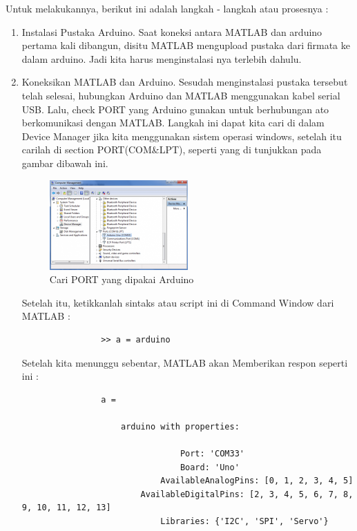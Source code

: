 	Untuk melakukannya, berikut ini adalah langkah - langkah atau prosesnya :
		\begin{enumerate}
			\item Instalasi Pustaka Arduino.
				Saat koneksi antara MATLAB dan arduino pertama kali dibangun, disitu MATLAB mengupload pustaka dari firmata ke dalam arduino. Jadi kita harus menginstalasi nya terlebih dahulu.
			\item Koneksikan MATLAB dan Arduino.
				Sesudah menginstalasi pustaka tersebut telah selesai, hubungkan Arduino dan MATLAB menggunakan kabel serial USB. Lalu, check PORT yang Arduino gunakan untuk berhubungan ato berkomunikasi dengan MATLAB. Langkah ini dapat kita cari di dalam Device Manager jika kita menggunakan sistem operasi windows, setelah itu carilah di section PORT(COM&LPT), seperti yang di tunjukkan pada gambar dibawah ini.
				
				\begin{figure}[ht]
					\centerline{\includegraphics[width=0.5\textwidth]{figures/knksi.png}}
					\caption{Cari PORT yang dipakai Arduino}
					\label{knksi}
			\end{figure}
				
				Setelah itu, ketikkanlah sintaks atau script ini di Command Window dari MATLAB :
				
				\begin{verbatim}
				>> a = arduino
				\end{verbatim}	
				
				Setelah kita menunggu sebentar, MATLAB akan Memberikan respon seperti ini :
				
				\begin{verbatim}
				a = 
 
					arduino with properties:
 
								Port: 'COM33'
								Board: 'Uno'
							AvailableAnalogPins: [0, 1, 2, 3, 4, 5]
						AvailableDigitalPins: [2, 3, 4, 5, 6, 7, 8, 9, 10, 11, 12, 13]
							Libraries: {'I2C', 'SPI', 'Servo'}
				\end{verbatim}
				

\end{enumerate}
